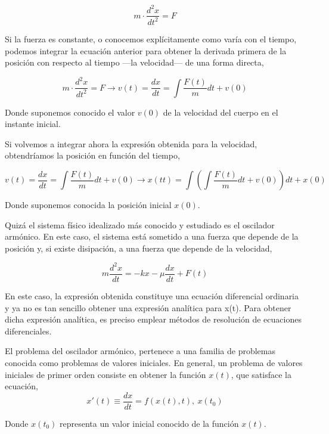 \begin{equation*}
m\cdot \frac{d^2x}{dt^2}=F
\end{equation*}

Si la fuerza es constante, o conocemos explícitamente como varía con el tiempo, podemos integrar la ecuación anterior para obtener la derivada primera de la posición con respecto al tiempo ---la velocidad--- de una forma directa,

\begin{equation*}
m\cdot \frac{d^2x}{dt^2}=F \rightarrow v(t)=\frac{dx}{dt}=\int \frac{F(t)}{m}dt +v(0)
\end{equation*}

Donde suponemos conocido el valor $v(0)$ de la velocidad del cuerpo en el instante inicial.

Si volvemos a integrar ahora la expresión obtenida para la velocidad, obtendríamos la posición en función del tiempo,

\begin{equation*}
v(t)=\frac{dx}{dt}=\int \frac{F(t)}{m}dt +v(0)\rightarrow x(tt)=\int\left(\int \frac{F(t)}{m}dt +v(0)\right)dt+x(0)
\end{equation*}

Donde suponemos conocida la posición inicial $x(0)$.

Quizá el sistema físico idealizado más conocido y estudiado es el oscilador armónico. En este caso, el sistema está sometido a una fuerza que depende de la posición y, si existe disipación, a una fuerza que depende de la velocidad,

\begin{equation*}
m\frac{d^2x}{dt}=-kx-\mu \frac{dx}{dt}+F(t)
\end{equation*}

En este caso, la expresión obtenida constituye una ecuación diferencial ordinaria y ya no es tan sencillo obtener una expresión analítica para x(t). Para obtener dicha expresión analítica, es preciso emplear métodos de resolución de ecuaciones diferenciales.

El problema del oscilador armónico, pertenece a una familia de problemas conocida como problemas de valores iniciales. En general, un problema de valores iniciales de primer orden consiste en obtener la función $x(t)$, que satisface la ecuación,
\begin{equation*}
x'(t)\equiv \frac{dx}{dt}=f(x(t),t), \ x(t_0)
\end{equation*}

Donde $x(t_0)$ representa un valor inicial conocido de la función $x(t)$.

